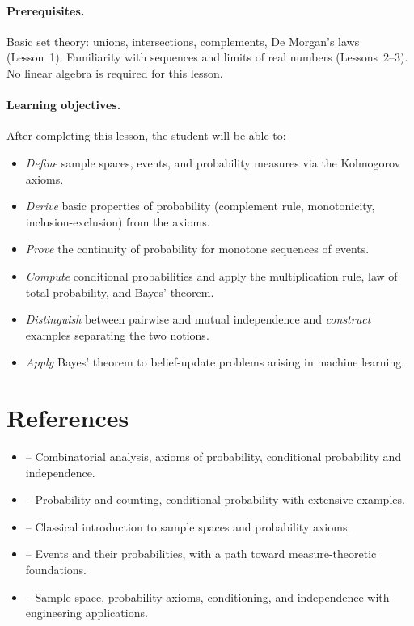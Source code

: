 \documentclass[11pt,a4paper]{article}
\begin{document}
\paragraph{Prerequisites.}
Basic set theory: unions, intersections, complements, De Morgan's laws
(Lesson~1). Familiarity with sequences and limits of real numbers
(Lessons~2--3). No linear algebra is required for this lesson.

\paragraph{Learning objectives.}
After completing this lesson, the student will be able to:
\begin{itemize}
    \item \emph{Define} sample spaces, events, and probability measures via
    the Kolmogorov axioms.
    \item \emph{Derive} basic properties of probability (complement rule,
    monotonicity, inclusion-exclusion) from the axioms.
    \item \emph{Prove} the continuity of probability for monotone sequences
    of events.
    \item \emph{Compute} conditional probabilities and apply the
    multiplication rule, law of total probability, and Bayes' theorem.
    \item \emph{Distinguish} between pairwise and mutual independence and
    \emph{construct} examples separating the two notions.
    \item \emph{Apply} Bayes' theorem to belief-update problems arising in
    machine learning.
\end{itemize}


\section{References}
\label{sec:references}

\begin{itemize}
    \item \citet[Chapters 1--2]{ross2019} -- Combinatorial analysis, axioms
    of probability, conditional probability and independence.
    \item \citet[Chapters 1--2]{blitzstein2019} -- Probability and counting,
    conditional probability with extensive examples.
    \item \citet[Chapter 1]{feller1968} -- Classical introduction to sample
    spaces and probability axioms.
    \item \citet[Chapter 1]{grimmett2020} -- Events and their probabilities,
    with a path toward measure-theoretic foundations.
    \item \citet[Chapters 1--2]{bertsekas2008} -- Sample space, probability
    axioms, conditioning, and independence with engineering applications.
\end{itemize}
\end{document}

